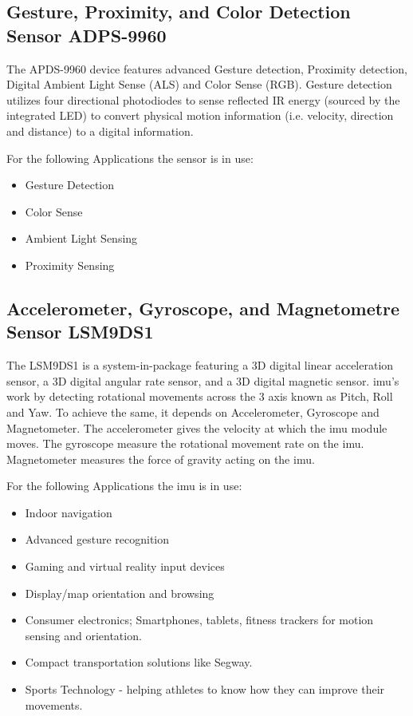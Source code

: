 
\subsection{Gesture, Proximity, and Color Detection Sensor ADPS-9960}

The APDS-9960 device features advanced Gesture detection, Proximity detection, Digital Ambient Light Sense (ALS) and Color Sense (RGB). \cite{Arduino:2021} Gesture detection utilizes four directional photodiodes to sense reflected IR energy (sourced by the integrated LED) to convert physical motion information (i.e. velocity, direction and distance) to a digital information.

For the following Applications the sensor is in use:

\begin{itemize}
    \item Gesture Detection
    \item Color Sense
    \item Ambient Light Sensing
    \item Proximity Sensing
\end{itemize}

\subsection{Accelerometer, Gyroscope, and Magnetometre Sensor LSM9DS1}

The LSM9DS1 is a system-in-package featuring a 3D digital linear acceleration sensor, a 3D digital angular rate sensor, and a 3D digital magnetic sensor. \ac{imu}'s work by detecting rotational movements across the 3 axis known as Pitch, Roll and Yaw. To achieve the same, it depends on Accelerometer, Gyroscope and Magnetometer. The accelerometer gives the velocity at which the \ac{imu} module moves. The gyroscope measure the rotational movement rate on the \ac{imu}. Magnetometer measures the force of gravity acting on the \ac{imu}.

For the following Applications the \ac{imu} is in use:


\begin{itemize}
  \item Indoor navigation
  \item Advanced gesture recognition
  \item Gaming and virtual reality input devices
  \item Display/map orientation and browsing
  \item Consumer electronics; Smartphones, tablets, fitness trackers for motion sensing and orientation.
  \item Compact transportation solutions like Segway.
  \item Sports Technology - helping athletes to know how they can improve their movements.
\end{itemize}


